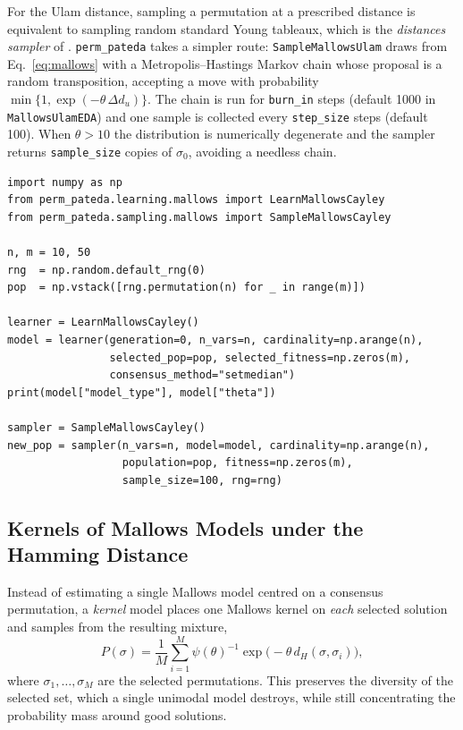 \documentclass[a4paper,11pt]{article}
\begin{document}
For the Ulam distance, sampling a permutation at a prescribed distance is
equivalent to sampling random standard Young tableaux, which is the
\emph{distances sampler} of \cite{Irurozki:2014}.  \texttt{perm\_pateda} takes a
simpler route: \texttt{SampleMallowsUlam} draws from
Eq.~\eqref{eq:mallows} with a Metropolis--Hastings Markov chain whose proposal is
a random transposition, accepting a move with probability
$\min\{1, \exp(-\theta\,\Delta d_u)\}$.  The chain is run for
\texttt{burn\_in} steps (default 1000 in \texttt{MallowsUlamEDA}) and one sample
is collected every \texttt{step\_size} steps (default 100).  When $\theta > 10$
the distribution is numerically degenerate and the sampler returns
\texttt{sample\_size} copies of $\sigma_0$, avoiding a needless chain.

\begin{lstlisting}
import numpy as np
from perm_pateda.learning.mallows import LearnMallowsCayley
from perm_pateda.sampling.mallows import SampleMallowsCayley

n, m = 10, 50
rng  = np.random.default_rng(0)
pop  = np.vstack([rng.permutation(n) for _ in range(m)])

learner = LearnMallowsCayley()
model = learner(generation=0, n_vars=n, cardinality=np.arange(n),
                selected_pop=pop, selected_fitness=np.zeros(m),
                consensus_method="setmedian")
print(model["model_type"], model["theta"])

sampler = SampleMallowsCayley()
new_pop = sampler(n_vars=n, model=model, cardinality=np.arange(n),
                  population=pop, fitness=np.zeros(m),
                  sample_size=100, rng=rng)
\end{lstlisting}

\subsection{Kernels of Mallows Models under the Hamming Distance}
\label{sec:kmm}

Instead of estimating a single Mallows model centred on a consensus permutation,
a \emph{kernel} model \citep{Arza_et_al:2020} places one Mallows kernel on
\emph{each} selected solution and samples from the resulting mixture,
\begin{equation}
P(\sigma) = \frac{1}{M}\sum_{i=1}^{M}
   \psi(\theta)^{-1}\exp\big(-\theta\, d_H(\sigma, \sigma_i)\big) ,
\end{equation}
where $\sigma_1,\ldots,\sigma_M$ are the selected permutations.  This preserves
the diversity of the selected set, which a single unimodal model destroys, while
still concentrating the probability mass around good solutions.
\end{document}
